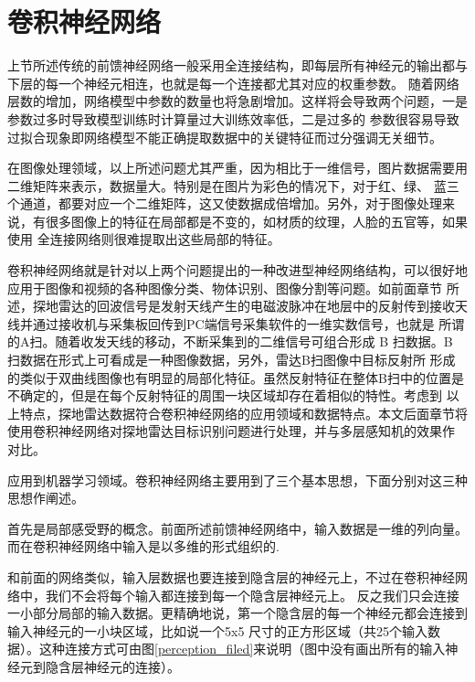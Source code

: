 \section{卷积神经网络}
上节所述传统的前馈神经网络一般采用全连接结构，即每层所有神经元的输出都与下层的每一个神经元相连，也就是每一个连接都尤其对应的权重参数。
随着网络层数的增加，网络模型中参数的数量也将急剧增加。这样将会导致两个问题，一是参数过多时导致模型训练时计算量过大训练效率低，二是过多的
参数很容易导致过拟合现象即网络模型不能正确提取数据中的关键特征而过分强调无关细节。

在图像处理领域，以上所述问题尤其严重，因为相比于一维信号，图片数据需要用二维矩阵来表示，数据量大。特别是在图片为彩色的情况下，对于红、绿、
蓝三个通道，都要对应一个二维矩阵，这又使数据成倍增加。另外，对于图像处理来说，有很多图像上的特征在局部都是不变的，如材质的纹理，人脸的五官等，如果使用
全连接网络则很难提取出这些局部的特征。

卷积神经网络就是针对以上两个问题提出的一种改进型神经网络结构，可以很好地应用于图像和视频的各种图像分类、物体识别、图像分割等问题。如前面章节
所述，探地雷达的回波信号是发射天线产生的电磁波脉冲在地层中的反射传到接收天线并通过接收机与采集板回传到PC端信号采集软件的一维实数信号，也就是
所谓的A扫。随着收发天线的移动，不断采集到的二维信号可组合形成 B 扫数据。B 扫数据在形式上可看成是一种图像数据，另外，雷达B扫图像中目标反射所
形成的类似于双曲线图像也有明显的局部化特征。虽然反射特征在整体B扫中的位置是不确定的，但是在每个反射特征的周围一块区域却存在着相似的特性。考虑到
以上特点，探地雷达数据符合卷积神经网络的应用领域和数据特点。本文后面章节将使用卷积神经网络对探地雷达目标识别问题进行处理，并与多层感知机的效果作
对比。
 
应用到机器学习领域。卷积神经网络主要用到了三个基本思想，下面分别对这三种思想作阐述。

首先是局部感受野的概念。前面所述前馈神经网络中，输入数据是一维的列向量。而在卷积神经网络中输入是以多维的形式组织的.

和前面的网络类似，输入层数据也要连接到隐含层的神经元上，不过在卷积神经网络中，我们不会将每个输入都连接到每一个隐含层神经元上。
反之我们只会连接一小部分局部的输入数据。更精确地说，第一个隐含层的每一个神经元都会连接到输入神经元的一小块区域，比如说一个5x5
尺寸的正方形区域（共25个输入数据）。这种连接方式可由图\ref{perception_filed}来说明（图中没有画出所有的输入神经元到隐含层神经元的连接）。

